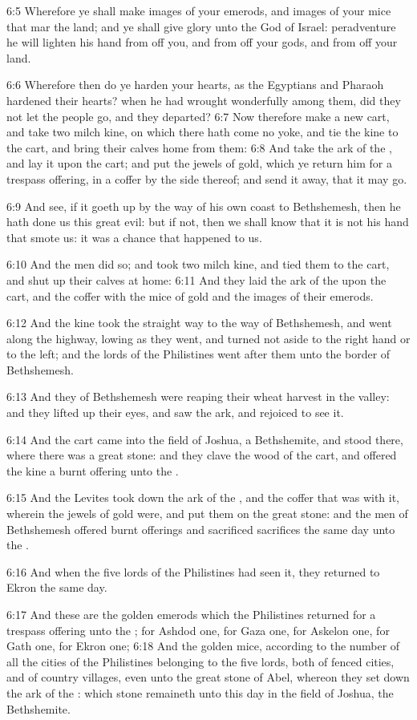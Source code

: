 6:5 Wherefore ye shall make images of your emerods, and images of your mice that mar the land; and ye shall give glory unto the God of Israel: peradventure he will lighten his hand from off you, and from off your gods, and from off your land.

6:6 Wherefore then do ye harden your hearts, as the Egyptians and Pharaoh hardened their hearts? when he had wrought wonderfully among them, did they not let the people go, and they departed?  6:7 Now therefore make a new cart, and take two milch kine, on which there hath come no yoke, and tie the kine to the cart, and bring their calves home from them: 6:8 And take the ark of the \LORD, and lay it upon the cart; and put the jewels of gold, which ye return him for a trespass offering, in a coffer by the side thereof; and send it away, that it may go.

6:9 And see, if it goeth up by the way of his own coast to Bethshemesh, then he hath done us this great evil: but if not, then we shall know that it is not his hand that smote us: it was a chance that happened to us.

6:10 And the men did so; and took two milch kine, and tied them to the cart, and shut up their calves at home: 6:11 And they laid the ark of the \LORD upon the cart, and the coffer with the mice of gold and the images of their emerods.

6:12 And the kine took the straight way to the way of Bethshemesh, and went along the highway, lowing as they went, and turned not aside to the right hand or to the left; and the lords of the Philistines went after them unto the border of Bethshemesh.

6:13 And they of Bethshemesh were reaping their wheat harvest in the valley: and they lifted up their eyes, and saw the ark, and rejoiced to see it.

6:14 And the cart came into the field of Joshua, a Bethshemite, and stood there, where there was a great stone: and they clave the wood of the cart, and offered the kine a burnt offering unto the \LORD.

6:15 And the Levites took down the ark of the \LORD, and the coffer that was with it, wherein the jewels of gold were, and put them on the great stone: and the men of Bethshemesh offered burnt offerings and sacrificed sacrifices the same day unto the \LORD.

6:16 And when the five lords of the Philistines had seen it, they returned to Ekron the same day.

6:17 And these are the golden emerods which the Philistines returned for a trespass offering unto the \LORD; for Ashdod one, for Gaza one, for Askelon one, for Gath one, for Ekron one; 6:18 And the golden mice, according to the number of all the cities of the Philistines belonging to the five lords, both of fenced cities, and of country villages, even unto the great stone of Abel, whereon they set down the ark of the \LORD: which stone remaineth unto this day in the field of Joshua, the Bethshemite.

